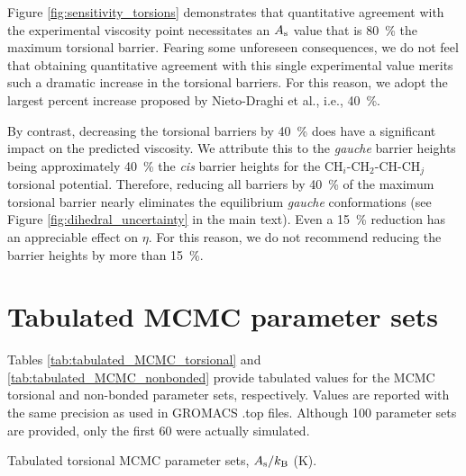 \documentclass[preprint,review,11pt]{elsarticle}
\begin{document}
	
	Figure \ref{fig:sensitivity_torsions} demonstrates that quantitative agreement with the experimental viscosity point necessitates an $A_{\rm s}$ value that is 80~\% the maximum torsional barrier. Fearing some unforeseen consequences, we do not feel that obtaining quantitative agreement with this single experimental value merits such a dramatic increase in the torsional barriers. For this reason, we adopt the largest percent increase proposed by Nieto-Draghi et al., i.e., 40~\%. 
	
	By contrast, decreasing the torsional barriers by 40~\% does have a significant impact on the predicted viscosity. We attribute this to the \textit{gauche} barrier heights being approximately 40~\% the \textit{cis} barrier heights for the CH$_i$-CH$_2$-CH-CH$_j$ torsional potential. Therefore, reducing all barriers by 40~\% of the maximum torsional barrier nearly eliminates the equilibrium \textit{gauche} conformations (see Figure \ref{fig:dihedral_uncertainty} in the main text). Even a 15~\% reduction has an appreciable effect on $\eta$. For this reason, we do not recommend reducing the barrier heights by more than 15~\%.	
	
	\clearpage
	\newpage
	
	\section{Tabulated MCMC parameter sets} \label{SI:Tabulated_MCMC}
	
	Tables \ref{tab:tabulated_MCMC_torsional} and \ref{tab:tabulated_MCMC_nonbonded} provide tabulated values for the MCMC torsional and non-bonded parameter sets, respectively. Values are reported with the same precision as used in GROMACS .top files. Although 100 parameter sets are provided, only the first 60 were actually simulated.
	
	\begin{table}[h!]
		\caption{Tabulated torsional MCMC parameter sets, $A_{\rm s}/k_{\rm B}$ (K).} \label{tab:tabulated_MCMC_torsional}
	\end{table}
	
\end{document}
